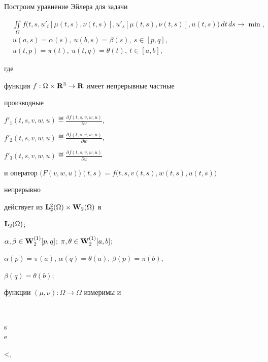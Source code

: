 \begin{exam} Построим уравнение Эйлера для задачи


\begin{equation}


\begin{split}


&\iint\limits_{\Omega}f\big(t,s,u'_t[\mu(t,s),\nu(t,s)],


u'_s[\mu(t,s),\nu(t,s)],u(t,s)\big)\,dt\,ds\longrightarrow\min,\\


&u(a,s)=\alpha(s),\ u(b,s)=\beta(s),\ s\in[p,q],\\


&u(t,p)=\pi(t),\ u(t,q)=\theta(t),\ t\in[a,b],


\end{split}


\end{equation}


где


функция $f:\Omega\times\bold R{}^3\to\bold R{}$ имеет непрерывные частные


производные


$f'_1(t,s,v,w,u)\eqdef\frac{\partial f(t,s,v,w,u)}{\partial v}$,


$f'_2(t,s,v,w,u)\eqdef\frac{\partial f(t,s,v,w,u)}{\partial w}$,


$f'_3(t,s,v,w,u)\eqdef\frac{\partial f(t,s,v,w,u)}{\partial u}$


и оператор $\big(F(v,w,u)\big)(t,s)=f\big(t,s,v(t,s),w(t,s),u(t,s)\big)$


непрерывно


действует из $\bold L{}_2^2(\Omega)\times\bold W{}_2(\Omega)$ в


$\bold L{}_2(\Omega)$;


$\alpha,\beta\in\bold W{}_2^{(1)}[p,q]$; $\pi,\theta\in\bold W{}_2^{(1)}[a,b]$;


$\alpha(p)=\pi(a)$, $\alpha(q)=\theta(a)$, $\beta(p)=\pi(b)$,


$\beta(q)=\theta(b)$;


функции $(\mu,\nu):\Omega\to\Omega$ измеримы и


$$


\vraisup\begin{Sb} s\in[p,q] \\ e\subset[a,b]\end{Sb}


<\infty,


\quad



\end{exam}
